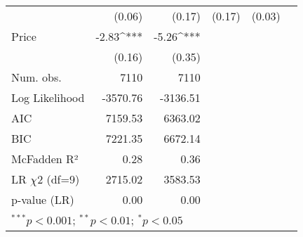 \begin{table}[h]
\begin{center}
\begin{tabular}{l D{.}{.}{5.5} D{.}{.}{5.5} D{.}{.}{2.5} D{.}{.}{2.5} D{.}{.}{3.2}}
                                   & (0.06)      & (0.17)      & (0.17)      & (0.03)     &        \\
Price                              & -2.83^{***} & -5.26^{***} &             &            &        \\
                                   & (0.16)      & (0.35)      &             &            &        \\
\midrule
Num. obs.                          & 7110        & 7110        &             &            &        \\
Log Likelihood                     & -3570.76    & -3136.51    &             &            &        \\
AIC                                & 7159.53     & 6363.02     &             &            &        \\
BIC                                & 7221.35     & 6672.14     &             &            &        \\
McFadden R²                        & 0.28        & 0.36        &             &            &        \\
LR $\chi 2$ (df=9)                       & 2715.02     & 3583.53     &             &            &        \\
p-value (LR)                       & 0.00        & 0.00        &             &            &        \\
\bottomrule
{}
\end{tabular}
\end{center}
\end{table}
